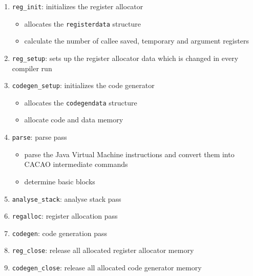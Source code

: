 \begin{enumerate}

 \item \texttt{reg\_init}: initializes the register allocator

  \begin{itemize}

   \item allocates the \texttt{registerdata} structure

   \item calculate the number of callee saved, temporary and argument
   registers

  \end{itemize}

 \item \texttt{reg\_setup}: sets up the register allocator data which
 is changed in every compiler run

 \item \texttt{codegen\_setup}: initializes the code generator

  \begin{itemize}

   \item allocates the \texttt{codegendata} structure

   \item allocate code and data memory

  \end{itemize}

 \item \texttt{parse}: parse pass

  \begin{itemize}

   \item parse the Java Virtual Machine instructions and convert them
   into CACAO intermediate commands

   \item determine basic blocks

  \end{itemize}

 \item \texttt{analyse\_stack}: analyse stack pass

 \item \texttt{regalloc}: register allocation pass

 \item \texttt{codegen}: code generation pass

 \item \texttt{reg\_close}: release all allocated register allocator
 memory

 \item \texttt{codegen\_close}: release all allocated code generator
 memory

\end{enumerate}

